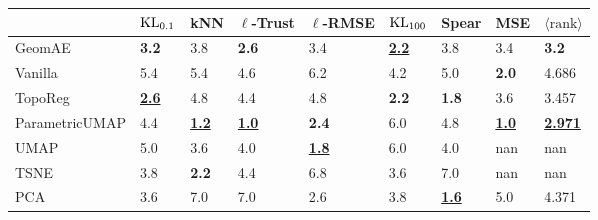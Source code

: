 \begin{tabular}{lllllllll}
\toprule
{} &               $\operatorname{KL}_{0.1}$ &                        kNN &               $\ell$-Trust &                $\ell$-RMSE &               $\operatorname{KL}_{100}$ &                      Spear &                        MSE & $\langle \text{rank} \rangle$ \\
\midrule
GeomAE         &               \textbf{3.2} &                        3.8 &               \textbf{2.6} &                        3.4 &   \underline{\textbf{2.2}} &                        3.8 &                        3.4 &                  \textbf{3.2} \\
Vanilla        &                        5.4 &                        5.4 &                        4.6 &                        6.2 &                        4.2 &                        5.0 &               \textbf{2.0} &                         4.686 \\
TopoReg        &   \underline{\textbf{2.6}} &                        4.8 &                        4.4 &                        4.8 &               \textbf{2.2} &               \textbf{1.8} &                        3.6 &                         3.457 \\
ParametricUMAP &                        4.4 &   \underline{\textbf{1.2}} &   \underline{\textbf{1.0}} &               \textbf{2.4} &                        6.0 &                        4.8 &   \underline{\textbf{1.0}} &    \underline{\textbf{2.971}} \\
UMAP           &                        5.0 &                        3.6 &                        4.0 &   \underline{\textbf{1.8}} &                        6.0 &                        4.0 &                        nan &                           nan \\
TSNE           &                        3.8 &               \textbf{2.2} &                        4.4 &                        6.8 &                        3.6 &                        7.0 &                        nan &                           nan \\
PCA            &                        3.6 &                        7.0 &                        7.0 &                        2.6 &                        3.8 &   \underline{\textbf{1.6}} &                        5.0 &                         4.371 \\
\bottomrule
\end{tabular}
